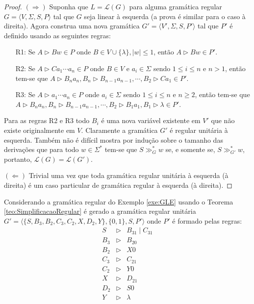 \begin{proof}
	$(\Rightarrow)$ Suponha que $L = \mathcal{L}(G)$ para alguma gramática regular $G = \langle V, \Sigma, S, P \rangle$ tal que $G$ seja linear à esquerda (a prova é similar para o caso à direita). Agora construa uma nova gramática $G' = \langle V', \Sigma, S, P' \rangle$ tal que $P'$ é definido usando as seguintes regras: 
	
	\begin{itemize}
		\item[R1:] Se $A \rhd Bw \in P$ onde $B \in V \cup \{\lambda\},  |w| \leq 1$, então $A \rhd Bw \in P'$.
		\item[R2:] Se $A \rhd Ca_1\cdots a_n \in P$ onde $B \in V$ e $a_i \in \Sigma$ sendo $1 \leq i \leq n$ e $n > 1$, então tem-se que $A \rhd B_na_n, B_n \rhd B_{n-1}a_{n-1}, \cdots, B_2 \rhd Ca_1 \in P'$.
		\item[R3:] Se $A \rhd a_1\cdots a_n \in P$ onde $a_i \in \Sigma$ sendo $1 \leq i \leq n$ e $n \geq 2$, então tem-se que $A \rhd B_na_n, B_n \rhd B_{n-1}a_{n-1}, \cdots, B_2 \rhd B_1a_1, B_1 \rhd \lambda \in P'$.
	\end{itemize}
	
	Para as regras R2 e R3 todo $B_i$ é uma nova variável existente em $V'$ que não existe originalmente em $V$. Claramente a gramática $G'$ é regular unitária à esquerda. Também não é difícil mostra por indução sobre o tamanho das derivações que para todo $w \in \Sigma^*$ tem-se que $S \gg^*_G w$ se, e somente se, $S \gg^*_{G'} w$, portanto, $\mathcal{L}(G) = \mathcal{L}(G')$.
	
	$(\Leftarrow)$ Trivial uma vez que toda gramática regular unitária à esquerda (à direita) é um caso particular de gramática regular à esquerda (à direita).
\end{proof}

\begin{example}\label{exe:GRU}
	Considerando a gramática regular do Exemplo \ref{exe:GLE} usando o Teorema \ref{teo:SimplificacaoRegular} é gerado a gramática regular unitária $G' = \langle \{S, B_3, B_2, C_3, C_2, X, D_2, Y\}, \{0, 1\}, S, P'\rangle$ onde $P'$ é formado pelas regras:
	\begin{eqnarray*}
		S & \rhd & B_31 \mid C_31\\
		B_3 & \rhd & B_20\\
		B_2 & \rhd & X0\\
		C_3 & \rhd & C_21\\
		C_2 & \rhd & Y0\\
		X & \rhd & D_21\\
		D_2 & \rhd& S0\\
		Y & \rhd & \lambda
	\end{eqnarray*}
\end{example}

